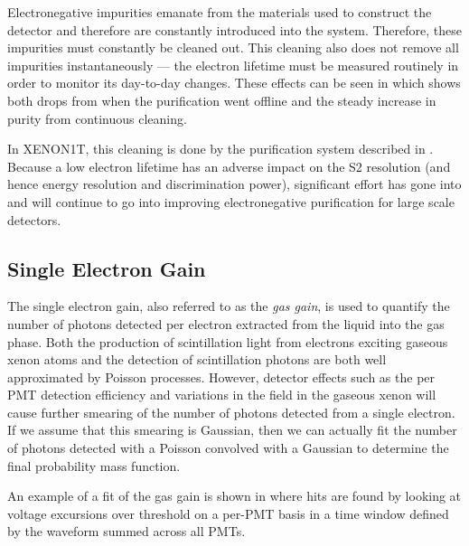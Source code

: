 Electronegative impurities emanate from the materials used to construct the detector and therefore are constantly introduced into the system.  Therefore, these impurities must constantly be cleaned out.  This cleaning also does not remove all impurities instantaneously --- the electron lifetime must be measured routinely in order to monitor its day-to-day changes.  These effects can be seen in  which shows both drops from when the purification went offline and the steady increase in purity from continuous cleaning.


In XENON1T, this cleaning is done by the purification system described in .  Because a low electron lifetime has an adverse impact on the S2 resolution (and hence energy resolution and discrimination power), significant effort has gone into and will continue to go into improving electronegative purification for large scale detectors.  


\subsection{Single Electron Gain}
\label{sec:xe1t_gas_gain}

The single electron gain, also referred to as the \textit{gas gain}, is used to quantify the number of photons detected per electron extracted from the liquid into the gas phase.  Both the production of scintillation light from electrons exciting gaseous xenon atoms and the detection of scintillation photons are both well approximated by Poisson processes.  However, detector effects such as the per PMT detection efficiency and variations in the field in the gaseous xenon will cause further smearing of the number of photons detected from a single electron.  If we assume that this smearing is Gaussian, then we can actually fit the number of photons detected with a Poisson convolved with a Gaussian to determine the final probability mass function.  

An example of a fit of the gas gain is shown in  where hits are found by looking at voltage excursions over threshold on a per-PMT basis in a time window defined by the waveform summed across all PMTs.

